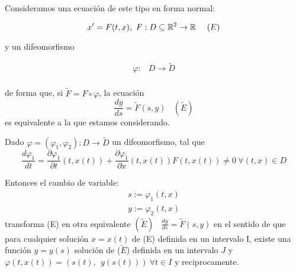 Consideramos una ecuación de este tipo en forma normal:

\[
  x' = F(t, x),\ F : D \subseteq \mathbb{R}^2 \to \mathbb{R} \ \ \ \ (E)
  \]

  y un difeomorfismo

  \[
  \begin{array}{lll}
    \varphi : & D \to \tilde{D} \\ 
  \end{array}
  \]

  de forma que, si $\tilde{F} = F \circ \varphi$, la ecuación
  \[ \dfrac{dy}{ds} = \tilde{F}(s, y) \ \ \ \ (\tilde{E})\]
  es equivalente a la que estamos considerando.


\begin{nprop}

Dado $\varphi = (\varphi _1, \varphi _2) : D \to \tilde{D}$ un difeomorfismo, tal que 
\[
\frac{d\varphi_1}{dt} = \dfrac{\partial \varphi_1}{\partial t}(t, x(t)) + \dfrac{\partial \varphi_1}{\partial x}(t, x(t)) F(t,x(t)) \neq 0 \ \forall (t,x) \in D
\]

Entonces el cambio de variable:
\[
\begin{array}{l}
  s := \varphi _1(t,x)\\
  y := \varphi _2 (t,x)
\end{array}
\]
transforma (E) en otra equivalente $(\tilde{E}) \ \ \ \ \frac{dy}{ds} = \tilde{F}(s,y)$ en el sentido de que para cualquier solución $x = x(t)$ de (E) definida en un intervalo I, existe una función $y=y(s)$ solución de ($\tilde{E}$) definida en un intervalo $J$ y $\varphi(t, x(t)) = (s(t), \ \ y(s(t))) \ \forall t \in I$ y reciprocamente.
\end{nprop}

